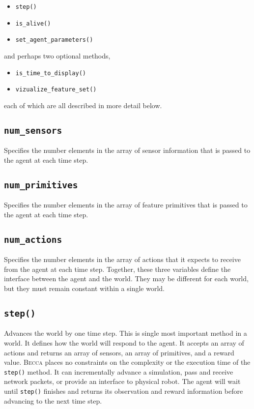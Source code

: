 \begin{itemize}
\item{\texttt{step()}}
\item{\texttt{is\_alive()}}
\item{\texttt{set\_agent\_parameters()}}
\end{itemize}

and perhaps two optional methods,

\begin{itemize}
\item{\texttt{is\_time\_to\_display()}}
\item{\texttt{vizualize\_feature\_set()}}
\end{itemize}

each of which are all described in more detail below.

\subsection{\texttt{num\_sensors}}
Specifies the number elements in the array of sensor information that is passed to the agent at each time step.

\subsection{\texttt{num\_primitives}}
Specifies the number elements in the array of feature primitives that is passed to the agent at each time step.

\subsection{\texttt{num\_actions}}
Specifies the number elements in the array of actions that it expects to receive from the agent at each time step. Together, these three variables define the interface between the agent and the world. They may be different for each world, but they must remain constant within a single world. 

\subsection{\texttt{step()}}
Advances the world by one time step. This is single most important method in a world. It defines how the world will respond to the agent. It accepts an array of actions and returns an array of sensors, an array of primitives, and a reward value. \textsc{Becca} places no constraints on the complexity or the execution time of the \texttt{step()} method. It can incrementally advance a simulation, pass and receive network packets, or provide an interface to physical robot. The agent will wait until \texttt{step()} finishes and returns its observation and reward information before advancing to the next time step.

